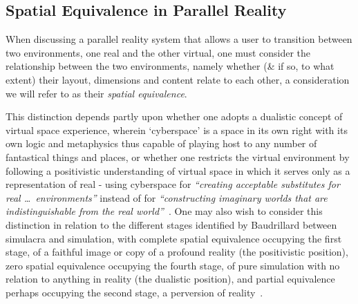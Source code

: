 
\subsection{Spatial Equivalence in Parallel Reality}

\label{spatial-equivalence}

\newcommand{\turklevrfootnote}{\footnote{\textit{``For virtual reality to be interesting it has to emulate the real. But you have to be able to do something in the virtual that you couldn't in the real.''}~\cite{Turkle1997}}}

When discussing a parallel reality system that allows a user to transition between two environments, one real and the other virtual, one must consider the relationship between the two environments, namely whether (\& if so, to what extent) their layout, dimensions and content relate to each other, a consideration we will refer to as their \textit{spatial equivalence}.

This distinction depends partly upon whether one adopts a dualistic concept of virtual space experience, wherein `cyberspace' is a space in its own right with its own logic and metaphysics thus capable of playing host to any number of fantastical things and places, or whether one restricts the virtual environment by following a positivistic understanding of virtual space in which it serves only as a representation of real - using cyberspace for \textit{``creating acceptable substitutes for real \ldots\ environments''} instead of for \textit{``constructing imaginary worlds that are indistinguishable from the real world''}~\cite{Qvortrup2002}. One may also wish to consider this distinction in relation to the different stages identified by Baudrillard between simulacra and simulation, with complete spatial equivalence occupying the first stage, of a faithful image or copy of a profound reality (the positivistic position), zero spatial equivalence occupying the fourth stage, of pure simulation with no relation to anything in reality (the dualistic position), and partial equivalence perhaps occupying the second stage, a perversion of reality~\cite{Baudrillard1994}.


